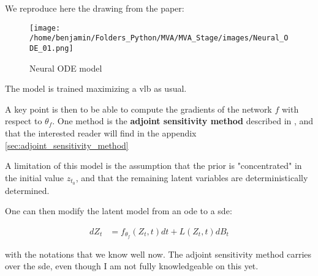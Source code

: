 We reproduce here the drawing from the paper:

\begin{figure}[H]
    \centering
    \texttt{[image: /home/benjamin/Folders\_Python/MVA/MVA\_Stage/images/Neural\_ODE\_01.png]}
    \caption{Neural ODE model}
    \label{fig:Neural ODE}
\end{figure}

The model is trained maximizing a \gls{vlb} as usual.

A key point is then to be able to compute the gradients of the network $f$ with respect to $\theta_f$. One method is 
the \textbf{adjoint sensitivity method} described in \cite{pontriagin_mathematical_2018}, and that the interested reader will find 
in the appendix \ref{sec:adjoint_sensitivity_method}

A limitation of this model is the assumption that the prior is "concentrated" in the initial value $z_{t_0}$, and that the 
remaining latent variables are deterministically determined.

One can then modify the latent model from an \gls{ode} to a \gls{sde}:

\begin{align}
    dZ_t &= f_{\theta_f}(Z_t, t)dt + L(Z_t,t)dB_t
\end{align}

with the notations that we know well now. The adjoint sensitivity method carries over the \gls{sde}, even though I am not 
fully knowledgeable on this yet.